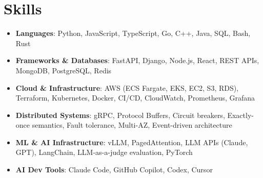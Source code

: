 \documentclass[letterpaper,11pt]{article}
\newcommand{\resumeSubHeadingListStart}{\begin{itemize}[leftmargin=0.15in, label={}]}
\newcommand{\resumeSubHeadingListEnd}{\end{itemize}}
\newcommand{\resumeSkillHeading}[2]{%
  \item\small{\textbf{#1}: #2 \vspace{-9pt}}%
}
\begin{document}
\section{Skills}
  \resumeSubHeadingListStart
    \resumeSkillHeading{Languages}{Python, JavaScript, TypeScript, Go, C++, Java, SQL, Bash, Rust}
    \resumeSkillHeading{Frameworks \& Databases}{FastAPI, Django, Node.js, React, REST APIs, MongoDB, PostgreSQL, Redis}
    \resumeSkillHeading{Cloud \& Infrastructure}{AWS (ECS Fargate, EKS, EC2, S3, RDS), Terraform, Kubernetes, Docker, CI/CD, CloudWatch, Prometheus, Grafana}
    \resumeSkillHeading{Distributed Systems}{gRPC, Protocol Buffers, Circuit breakers, Exactly-once semantics, Fault tolerance, Multi-AZ, Event-driven architecture}
    \resumeSkillHeading{ML \& AI Infrastructure}{vLLM, PagedAttention, LLM APIs (Claude, GPT), LangChain, LLM-as-a-judge evaluation, PyTorch}
    \resumeSkillHeading{AI Dev Tools}{Claude Code, GitHub Copilot, Codex, Cursor}
  \resumeSubHeadingListEnd
\end{document}
